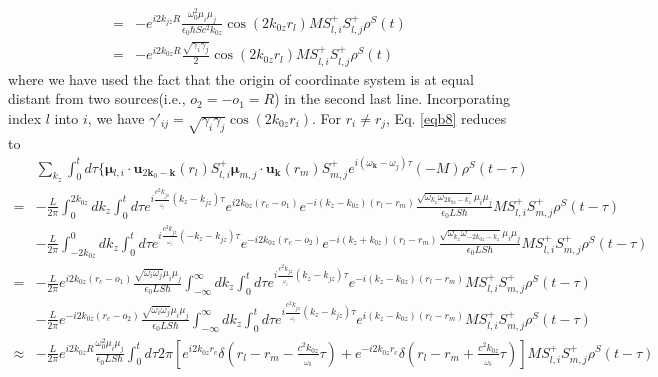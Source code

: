 \documentclass[aps,showpacs,twocolumn,twoside,groupedaddress]{revtex4}
\let\vec\bm
\begin{document}
\begin{widetext}
\begin{equation}
\begin{split}
=&-e^{i2k_{jz}R}\frac{\omega_{0}^{2}\mu_{i}\mu_{j}}{\epsilon_{0}\hbar Sc^{2}k_{0z}}\cos(2k_{0z}r_{l})M S_{l,i}^{+}S_{l,j}^{+}\rho^{S}(t)\\
=&-e^{i2k_{0z}R}\frac{\sqrt{\gamma_{i}\gamma_{j}}}{2}\cos(2k_{0z}r_{l})M S_{l,i}^{+}S_{l,j}^{+}\rho^{S}(t)
\end{split}
\end{equation}
where we have used the fact that the origin of coordinate system is at equal distant from two sources(i.e., $o_2=-o_1=R$) in the second last line. Incorporating index $l$ into $i$, we have $\gamma'_{ij}=\sqrt{\gamma_{i}\gamma_{j}}\cos(2k_{0z}r_{i})$. For $r_i\neq r_j$, Eq.  \eqref{eqb8} reduces to
\begin{equation}
\label{eqb10}\tag{A9}
\begin{split}
&\underset{k_{z}}{\sum}\int_{0}^{t}d\tau\{\vec{\mu}{}_{l,i}\cdot\vec{u}_{2\vec{k}_{0}-\vec{k}}(r_{l})S_{l,i}^{+}\vec{\mu}_{m,j}\cdot\vec{u}_{\vec{k}}(r_{m})S_{m,j}^{+}e^{i(\omega_{\vec{k}}-\omega_{j})\tau}(-M)\rho^{S}(t-\tau)\\
=&-\frac{L}{2\pi}\int_{0}^{2k_{0z}}dk_{z}\int_{0}^{t}d\tau e^{i\frac{c^{2}k_{jz}}{_{\omega_{j}}}(k_{z}-k_{jz})\tau}e^{i2k_{0z}(r_{c}-o_{1})}e^{-i(k_{z}-k_{0z})(r_{l}-r_{m})}\frac{\sqrt{\omega_{k_{z}}\omega_{2k_{0z}-k_{z}}}\mu_{i}\mu_{j}}{\epsilon_{0}LS\hbar}M S_{l,i}^{+}S_{m,j}^{+}\rho^{S}(t-\tau) \\
& -\frac{L}{2\pi}\int_{-2k_{0z}}^{0}dk_{z}\int_{0}^{t}d\tau e^{i\frac{c^{2}k_{jz}}{_{\omega_{j}}}(-k_{z}-k_{jz})\tau}e^{-i2k_{0z}(r_{c}-o_{2})}e^{-i(k_{z}+k_{0z})(r_{l}-r_{m})}\frac{\sqrt{\omega_{k_{z}}\omega_{-2k_{0z}-k_{z}}}\mu_{i}\mu_{j}}{\epsilon_{0}LS\hbar}M S_{l,i}^{+}S_{m,j}^{+}\rho^{S}(t-\tau)\\
=&-\frac{L}{2\pi}e^{i2k_{0z}(r_{c}-o_{1})}\frac{\sqrt{\omega_{i}\omega_{j}}\mu_{i}\mu_{j}}{\epsilon_{0}LS\hbar}\int_{-\infty}^{\infty}dk_{z}\int_{0}^{t}d\tau e^{i\frac{c^{2}k_{jz}}{_{\omega_{j}}}(k_{z}-k_{jz})\tau}e^{-i(k_{z}-k_{0z})(r_{l}-r_{m})}M S_{l,i}^{+}S_{m,j}^{+}\rho^{S}(t-\tau)\\
&-\frac{L}{2\pi}e^{-i2k_{0z}(r_{c}-o_{2})}\frac{\sqrt{\omega_{i}\omega_{j}}\mu_{i}\mu_{j}}{\epsilon_{0}LS\hbar}\int_{-\infty}^{\infty}dk_{z}\int_{0}^{t}d\tau e^{i\frac{c^{2}k_{jz}}{_{\omega_{j}}}(k_{z}-k_{jz})\tau}e^{i(k_{z}-k_{0z})(r_{l}-r_{m})}M S_{l,i}^{+}S_{m,j}^{+}\rho^{S}(t-\tau) \\
\approx&-\frac{L}{2\pi}e^{i2k_{0z}R}\frac{\omega_{0}^{2}\mu_{i}\mu_{j}}{\epsilon_{0}LS\hbar}\int_{0}^{t}d\tau2\pi[e^{i2k_{0z}r_{c}}\delta(r_{l}-r_{m}-\frac{c^{2}k_{0z}}{_{\omega_{0}}}\tau)+e^{-i2k_{0z}r_{c}}\delta(r_{l}-r_{m}+\frac{c^{2}k_{0z}}{_{\omega_{0}}}\tau)]M S_{l,i}^{+}S_{m,j}^{+}\rho^{S}(t-\tau) \\

\end{split}
\end{equation}
\end{widetext}
\end{document}
